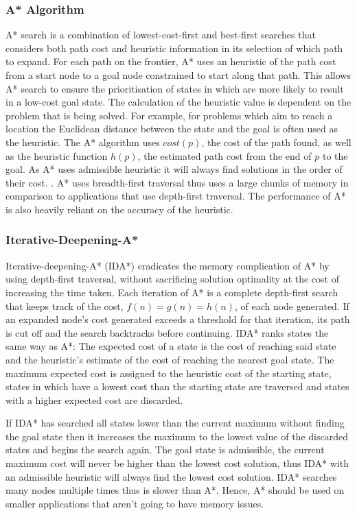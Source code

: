\documentclass[review]{cmpreport}
\begin{document}
\subsubsection{A* Algorithm}
A* search is a combination of lowest-cost-first and best-first searches that considers both path cost and heuristic information in its selection of which path to expand. For each path on the frontier, A* uses an heuristic of the path cost from a start node to a goal node constrained to start along that path. This allows A* search to ensure the prioritisation of states in which are more likely to result in a low-cost goal state. The calculation of the heuristic value is dependent on the problem that is being solved. For example, for problems which aim to reach a location the Euclidean distance between the state and the goal is often used as the heuristic. 
The A* algorithm uses $cost(p)$, the cost of the path found, as well as the heuristic function $h(p)$, the estimated path cost from the end of $p$ to the goal. As A* uses admissible heuristic it will always find solutions in the order of their cost. \citep{DBLP:journals/ker/Brewka96}.  A* uses breadth-first traversal thus uses a large chunks of memory in comparison to applications that use depth-first traversal. The performance of A* is also heavily reliant on the accuracy of the heuristic.

\subsubsection{Iterative-Deepening-A*}
Iterative-deepening-A* (IDA*) eradicates the memory complication of A* by using depth-first traversal, without sacrificing solution optimality at the cost of increasing the time taken. Each iteration of A* is a complete depth-first search that keeps track of the cost, $f(n) = g(n) = h(n)$, of each node generated. If an expanded node's cost generated exceeds a threshold for that iteration, its path is cut off and the search backtracks before continuing. IDA* ranks states the same way as A*: The expected cost of a state is the cost of reaching said state and the heuristic's estimate of the cost of reaching the nearest goal state. The maximum expected cost is assigned to the heuristic cost of the starting state, states in which have a lowest cost than the starting state are traversed and states with a higher expected cost are discarded. 


If IDA* has searched all states lower than the current maximum without finding the goal state then it increases the maximum to the lowest value of the discarded states and begins the search again. The goal state is admissible, the current maximum cost will never be higher than the lowest cost solution, thus IDA* with an admissible heuristic will always find the lowest cost solution.  IDA* searches many nodes multiple times thus is slower than A*. Hence, A* should be used on smaller applications that aren't going to have memory issues.
\end{document}
